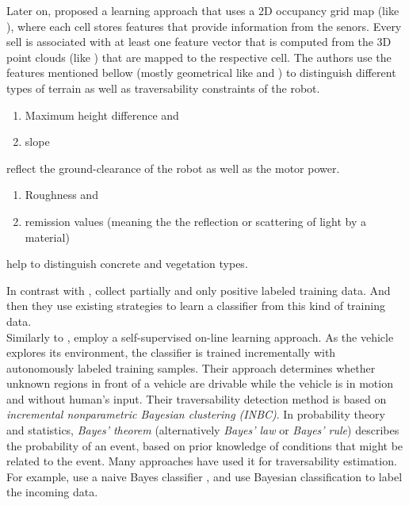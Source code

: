 \documentclass[12pt,a4paper,table,dvipsnames,tikz]{report}
\newcommand{\term}{\textit}
\newcommand{\acronym}{\MakeUppercase}
\begin{document}
	Later on, \citet{Suger} proposed a learning approach that uses a \acronym{2d} 
	occupancy grid map (like \citet{Shneier}), where each cell stores features that 
	provide information from the senors. Every sell is associated with at least one 
	feature vector that is computed from the \acronym{3d} point clouds (like 
	\citet{Lalonde}) that are mapped to the respective cell. The authors use the 
	features mentioned bellow (mostly geometrical like \citet{Lalonde} and 
	\citet{Pfaff}) to distinguish different types of terrain as well as 
	traversability constraints of the robot. 
	\begin{enumerate}
		\item Maximum height difference and
		\item slope 
	\end{enumerate}
	reflect the ground-clearance of the robot as well as the motor power.
	\begin{enumerate}
		\item Roughness and
		\item remission values (meaning the the reflection or scattering 
		of light by a material) 
	\end{enumerate}
	help to distinguish concrete and vegetation types.
	\par
	In contrast with \citet{Kim}, \citet{Suger} collect partially and only positive labeled 
	training data. And then they use existing strategies \citep{Denis, Elkan} to 
	learn a classifier from this kind of training data.
	\\
	
	Similarly to \citet{Kim}, \citet{Lee} employ a self-supervised on-line learning 
	approach. As the vehicle explores its environment, the classifier is trained 
	incrementally with autonomously labeled training samples. Their approach 
	determines whether unknown regions in front of a vehicle are drivable while the 
	vehicle is in motion and without human’s input. Their traversability detection 
	method is based on \term{incremental nonparametric Bayesian clustering 
	(\acronym{inbc})}. In probability theory and statistics, \term{Bayes' theorem} 
	(alternatively \term{Bayes' law} or \term{Bayes' rule}) describes the probability 
	of an event, based on prior knowledge of conditions that might be related to the 
	event. Many approaches have used it for traversability estimation. For example, 
	\citet{Suger} use a naive Bayes classifier \citep{Denis}, and \citet{Lalonde} use 
	Bayesian classification to label the incoming data.
	\\
	
\end{document}
